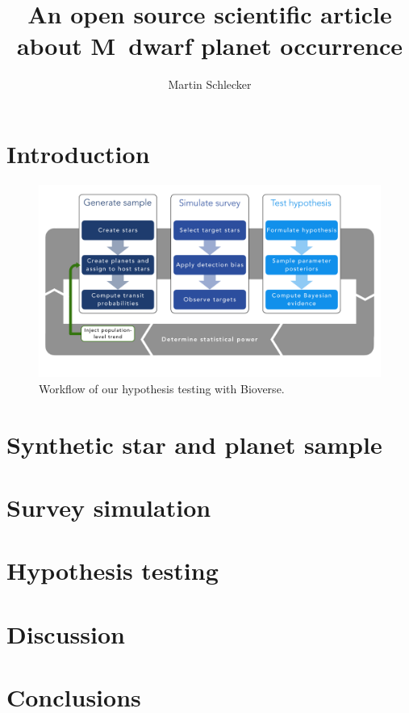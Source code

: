 \documentclass[twocolumn]{aastex631}
\begin{document}
\title{An open source scientific article about M~dwarf planet occurrence}

\author[0000-0001-8355-2107]{Martin Schlecker}


\begin{abstract}
    \blindtext
\end{abstract}

\section{Introduction}
\Blindtext[4]

\begin{figure}
    \begin{centering}
        \includegraphics[width=\hsize]{static/flowchart}
        \caption{Workflow of our hypothesis testing with Bioverse.}
        \label{fig:flowchart}
    \end{centering}
\end{figure}

\section{Synthetic star and planet sample}


\section{Survey simulation}


\section{Hypothesis testing}


\section{Discussion}


\section{Conclusions}
\end{document}
